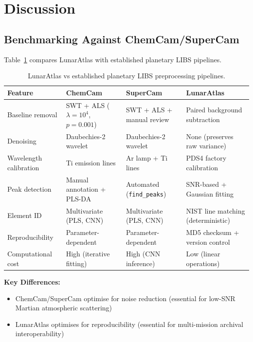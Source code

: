 \documentclass[a4paper,twocolumn,10pt]{article}
\begin{document}
\section{Discussion}
\label{sec:discussion}

\subsection{Benchmarking Against ChemCam/SuperCam}

Table~\ref{tab:method_comparison} compares LunarAtlas with established
planetary LIBS pipelines.

\begin{table}[!t]
\centering
\caption{LunarAtlas vs established planetary LIBS preprocessing pipelines.}
\label{tab:method_comparison}
{\small
\begin{tabularx}{\textwidth}{@{}lXXX@{}}
\toprule
\textbf{Feature} & \textbf{ChemCam} & \textbf{SuperCam} &
  \textbf{LunarAtlas} \\
\midrule
Baseline removal & SWT + ALS ($\lambda=10^4$, $p=0.001$) &
  SWT + ALS + manual review & Paired background subtraction \\
Denoising & Daubechies-2 wavelet & Daubechies-2 wavelet &
  None (preserves raw variance) \\
Wavelength calibration & Ti emission lines & Ar lamp + Ti lines &
  PDS4 factory calibration \\
Peak detection & Manual annotation + PLS-DA & Automated
  (\texttt{find\_peaks}) & SNR-based + Gaussian fitting \\
Element ID & Multivariate (PLS, CNN) & Multivariate (PLS, CNN) &
  NIST line matching (deterministic) \\
Reproducibility & Parameter-dependent & Parameter-dependent &
  MD5 checksum + version control \\
Computational cost & High (iterative fitting) & High (CNN inference) &
  Low (linear operations) \\
\bottomrule
\end{tabularx}
}
\end{table}

\textbf{Key Differences:}
\begin{itemize}[nosep,leftmargin=*]
  \item ChemCam/SuperCam optimise for noise reduction (essential for
    low-SNR Martian atmospheric scattering)
  \item LunarAtlas optimises for reproducibility (essential for
    multi-mission archival interoperability)
\end{itemize}
\end{document}
